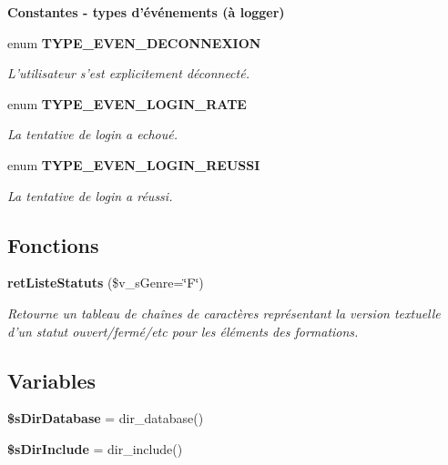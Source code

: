 \begin{Indent}{\bf Constantes - types d'événements (à logger)}\par
\begin{CompactItemize}
\item 
enum {\bf TYPE\_\-EVEN\_\-DECONNEXION} 
\begin{CompactList}\small\item\em L'utilisateur s'est explicitement déconnecté. \item\end{CompactList}\item 
enum {\bf TYPE\_\-EVEN\_\-LOGIN\_\-RATE} 
\begin{CompactList}\small\item\em La tentative de login a echoué. \item\end{CompactList}\item 
enum {\bf TYPE\_\-EVEN\_\-LOGIN\_\-REUSSI} 
\begin{CompactList}\small\item\em La tentative de login a réussi. \item\end{CompactList}\end{CompactItemize}
\end{Indent}
\subsection*{Fonctions}
\begin{CompactItemize}
\item 
{\bf retListeStatuts} (\$v\_\-sGenre=\char`\"{}F\char`\"{})
\begin{CompactList}\small\item\em Retourne un tableau de chaînes de caractères représentant la version textuelle d'un statut ouvert/fermé/etc pour les éléments des formations. \item\end{CompactList}\end{CompactItemize}
\subsection*{Variables}
\begin{CompactItemize}
\item 
\textbf{\$sDirDatabase} = dir\_\-database()\label{plate__forme_8class_8php_10892d06666ceb83982eafff03ca80b5}

\item 
\textbf{\$sDirInclude} = dir\_\-include()\label{plate__forme_8class_8php_17b09941c14c8f755ebc693858657541}

\end{CompactItemize}


